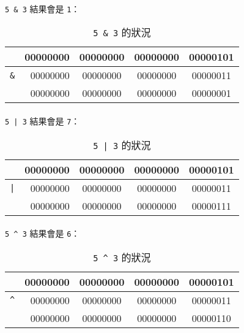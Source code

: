 \documentclass[12pt,a4paper,oneside]{article}
\begin{document}
\begin{CJK}{UTF8}{bkai}
\paragraph{}\lstinline!5 & 3! 結果會是 \lstinline!1!：

\begin{table}[h!]
\centering
\begin{tabular}{|c|r|c|c|c|}
\hline
 & 00000000 & 00000000 & 00000000 & 00000{\color{red}101}\\
\hline
\lstinline!&! & 00000000 & 00000000 & 00000000 & 00000{\color{red}011}\\
\hline\hline
 & 00000000 & 00000000 & 00000000 & 00000{\color{red}001}\\
\hline
\end{tabular}
\caption{\lstinline!5 & 3! 的狀況}
\label{basic:cpp:table:5:and:3}
\end{table}

\paragraph{}\lstinline!5 | 3! 結果會是 \lstinline!7!：

\begin{table}[h!]
\centering
\begin{tabular}{|c|r|c|c|c|}
\hline
 & 00000000 & 00000000 & 00000000 & 00000{\color{red}101}\\
\hline
\lstinline!|! & 00000000 & 00000000 & 00000000 & 00000{\color{red}011}\\
\hline\hline
 & 00000000 & 00000000 & 00000000 & 00000{\color{red}111}\\
\hline
\end{tabular}
\caption{\lstinline!5 | 3! 的狀況}
\label{basic:cpp:table:5:or:3}
\end{table}

\paragraph{}\lstinline!5 ^ 3! 結果會是 \lstinline!6!：

\begin{table}[h!]
\centering
\begin{tabular}{|c|r|c|c|c|}
\hline
 & 00000000 & 00000000 & 00000000 & 00000{\color{red}101}\\
\hline
\lstinline!^! & 00000000 & 00000000 & 00000000 & 00000{\color{red}011}\\
\hline\hline
 & 00000000 & 00000000 & 00000000 & 00000{\color{red}110}\\
\hline
\end{tabular}
\caption{\lstinline!5 ^ 3! 的狀況}
\label{basic:cpp:table:5:xor:3}
\end{table}


\end{CJK}
\end{document}
